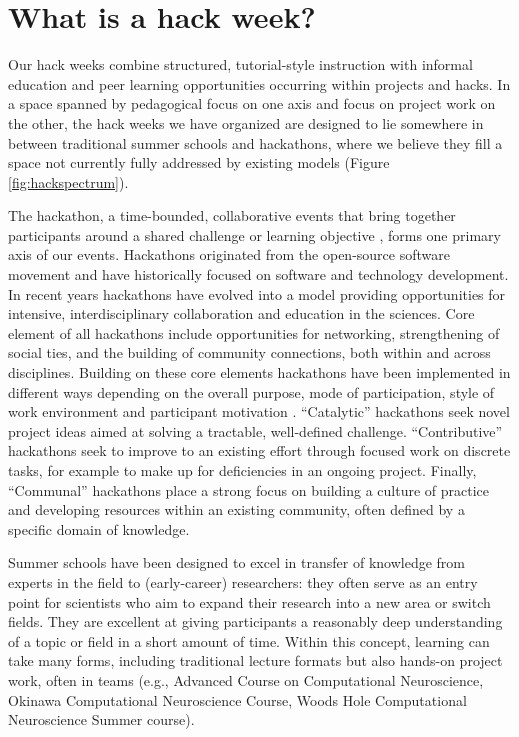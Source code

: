 \section*{What is a hack week?}

Our hack weeks combine structured, tutorial-style instruction with informal education and peer learning opportunities occurring within projects and hacks. In a space spanned by pedagogical focus on one axis and focus on project work on the other, the hack weeks we have organized are designed to lie somewhere in between traditional summer schools and hackathons, where we believe they fill a space not currently fully addressed by existing models (Figure \ref{fig:hackspectrum}).

The hackathon, a time-bounded, collaborative events that bring together participants around a shared challenge or learning objective \cite{Decker2015}, forms one primary axis of our events. 
Hackathons originated from the open-source software movement and have historically focused on software and technology development. 
In recent years hackathons have evolved into a model providing opportunities for intensive, interdisciplinary collaboration \cite{Groen2015-cj} and education \cite{Kienzler2015-zu,Lamers2014-xf} in the sciences. 
Core element of all hackathons include opportunities for networking, strengthening of social ties, and the building of community connections, both within and across disciplines.
Building on these core elements hackathons have been implemented in different ways depending on the overall purpose, mode of participation, style of work environment and participant motivation \cite{Drouhard2017}. 
``Catalytic'' hackathons seek novel project ideas aimed at solving a tractable, well-defined challenge.
``Contributive'' hackathons seek to improve to an existing effort through focused work on discrete tasks, for example to make up for deficiencies in an ongoing project.
Finally, ``Communal'' hackathons place a strong focus on building a culture of practice and developing resources within an existing community, often defined by a specific domain of knowledge.

Summer schools have been designed to excel in transfer of knowledge from experts in the field to (early-career) researchers: they often serve as an entry point for scientists who aim to expand their research into a new area or switch fields. They are excellent at giving participants a reasonably deep understanding of a topic or field in a short amount of time. Within this concept, learning can take many forms, including traditional lecture formats but also hands-on project work, often in teams (e.g., Advanced Course on Computational Neuroscience, Okinawa Computational Neuroscience Course, Woods Hole Computational Neuroscience Summer course). 

